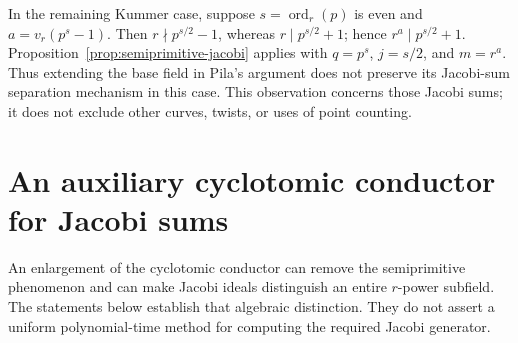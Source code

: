 \documentclass[11pt]{article}
\theoremstyle{definition}
\theoremstyle{remark}
\begin{document}
In the remaining Kummer case, suppose $s=\operatorname{ord}_r(p)$
is even and $a=v_r(p^s-1)$.
Then $r\nmid p^{s/2}-1$, whereas $r\mid p^{s/2}+1$;
hence $r^a\mid p^{s/2}+1$.
Proposition~\ref{prop:semiprimitive-jacobi} applies with
$q=p^s$, $j=s/2$, and $m=r^a$.
Thus extending the base field in Pila's argument does not preserve
its Jacobi-sum separation mechanism in this case.
This observation concerns those Jacobi sums; it does not exclude
other curves, twists, or uses of point counting.

\section{An auxiliary cyclotomic conductor for Jacobi sums}
\label{sec:auxiliary-cm-conductor}

An enlargement of the cyclotomic conductor can remove the
semiprimitive phenomenon and can make Jacobi ideals distinguish
an entire \(r\)-power subfield. The statements below establish
that algebraic distinction. They do not assert a uniform
polynomial-time method for computing the required Jacobi generator.
\end{document}
